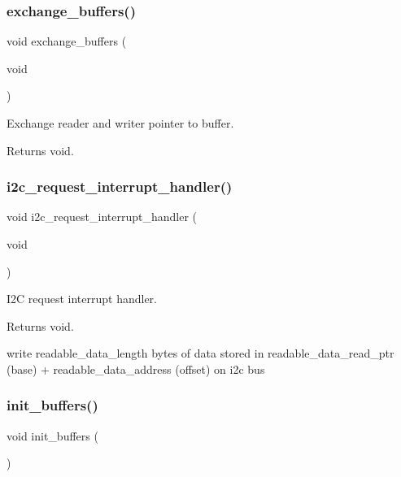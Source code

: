 \subsubsection{\texorpdfstring{exchange\+\_\+buffers()}{exchange\_buffers()}}
{\footnotesize\ttfamily void exchange\+\_\+buffers (\begin{DoxyParamCaption}\item[{void}]{ }\end{DoxyParamCaption})}



Exchange reader and writer pointer to buffer. 

\begin{DoxyReturn}{Returns}
void. 
\end{DoxyReturn}
\mbox{\label{i2c-th_8h_ac1da31566bf05976ecb87372278a1ea8}} 
\subsubsection{\texorpdfstring{i2c\+\_\+request\+\_\+interrupt\+\_\+handler()}{i2c\_request\_interrupt\_handler()}}
{\footnotesize\ttfamily void i2c\+\_\+request\+\_\+interrupt\+\_\+handler (\begin{DoxyParamCaption}\item[{void}]{ }\end{DoxyParamCaption})}



I2C request interrupt handler. 

\begin{DoxyReturn}{Returns}
void. 
\end{DoxyReturn}
write readable\+\_\+data\+\_\+length bytes of data stored in readable\+\_\+data\+\_\+read\+\_\+ptr (base) + readable\+\_\+data\+\_\+address (offset) on i2c bus \mbox{\label{i2c-th_8h_ad438327c9cf783bd9c519ce8b8ef3bfa}} 
\subsubsection{\texorpdfstring{init\+\_\+buffers()}{init\_buffers()}}
{\footnotesize\ttfamily void init\+\_\+buffers (\begin{DoxyParamCaption}{ }\end{DoxyParamCaption})}



